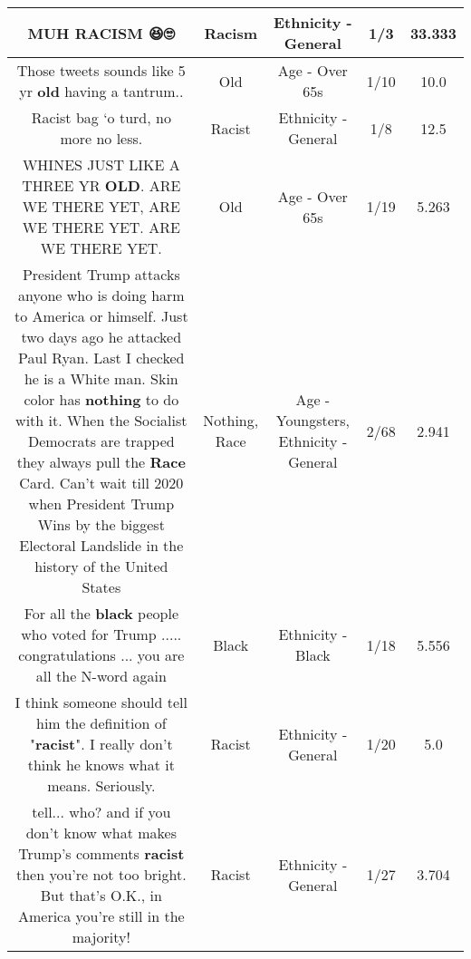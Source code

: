 \documentclass[11pt]{article}
\newlength\mylength
\begin{document}
\begin{center}
\begin{longtable}{|C{.65\mylength}|C{.30\mylength}|C{.12\mylength}|C{.12\mylength}|C{.12\mylength}|}
  \small MUH \textbf{RACISM} 😆🙄\normalsize   & Racism & Ethnicity - General & 1/3 & 33.333 \\  \hline
  \small Those tweets sounds like 5 yr \textbf{old} having a tantrum..\normalsize   & Old & Age - Over 65s & 1/10 & 10.0 \\  \hline
  \small Racist bag ‘o turd, no more no less.\normalsize   & Racist & Ethnicity - General & 1/8 & 12.5 \\  \hline
  \small WHINES JUST LIKE A THREE YR \textbf{OLD}. ARE WE THERE YET, ARE WE THERE YET. ARE WE THERE YET.\normalsize   & Old & Age - Over 65s & 1/19 & 5.263 \\  \hline
  \small President Trump attacks anyone who is doing harm to America or himself. Just two days ago he attacked Paul Ryan. Last I checked he is a White man. Skin color has \textbf{nothing} to do with it. When the Socialist Democrats are trapped they  always pull the \textbf{Race} Card. Can't wait till 2020 when President Trump Wins by the biggest Electoral Landslide in the history of the United States\normalsize   & Nothing, Race & Age - Youngsters, Ethnicity - General & 2/68 & 2.941 \\  \hline
  \small For all the \textbf{black} people who voted for Trump  .....  congratulations  ...  you are all the N-word again\normalsize   & Black & Ethnicity - Black & 1/18 & 5.556 \\  \hline
  \small I think someone should tell him the definition of "\textbf{racist}".  I really don't think he knows what it means.  Seriously.\normalsize   & Racist & Ethnicity - General & 1/20 & 5.0 \\  \hline
  \small tell... who? and if you don't know what makes Trump's comments \textbf{racist} then you're not too bright. But that's O.K., in America you're still in the majority!\normalsize   & Racist & Ethnicity - General & 1/27 & 3.704 \\  \hline

\end{longtable}
\end{center}
\end{document}
